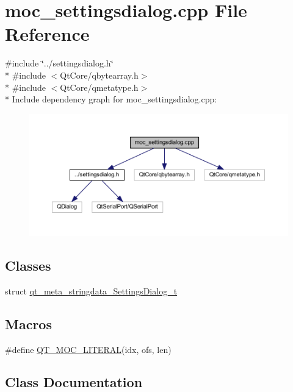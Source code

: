 \hypertarget{a00018}{\section{moc\+\_\+settingsdialog.\+cpp File Reference}
\label{a00018}
}
{\ttfamily \#include \char`\"{}../settingsdialog.\+h\char`\"{}}\\*
{\ttfamily \#include $<$Qt\+Core/qbytearray.\+h$>$}\\*
{\ttfamily \#include $<$Qt\+Core/qmetatype.\+h$>$}\\*
Include dependency graph for moc\+\_\+settingsdialog.\+cpp\+:
\nopagebreak
\begin{figure}[H]
\begin{center}
\leavevmode
\includegraphics[width=350pt]{d7/d6e/a00190}
\end{center}
\end{figure}
\subsection*{Classes}
\begin{DoxyCompactItemize}
\item 
struct \hyperlink{a00018_d4/d98/a00120}{qt\+\_\+meta\+\_\+stringdata\+\_\+\+Settings\+Dialog\+\_\+t}
\end{DoxyCompactItemize}
\subsection*{Macros}
\begin{DoxyCompactItemize}
\item 
\#define \hyperlink{a00018_a75bb9482d242cde0a06c9dbdc6b83abe}{Q\+T\+\_\+\+M\+O\+C\+\_\+\+L\+I\+T\+E\+R\+A\+L}(idx, ofs, len)
\end{DoxyCompactItemize}


\subsection{Class Documentation}
\label{d4/d98/a00120}
\hypertarget{a00018_d4/d98/a00120}{}
